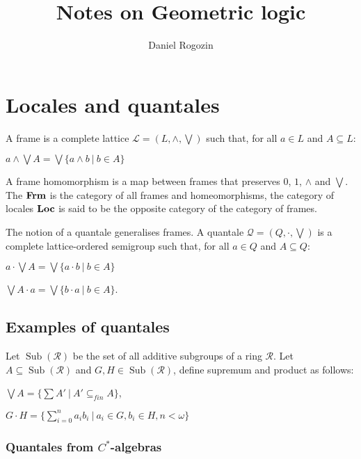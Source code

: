 \documentclass[a4paper]{article}
\author{Daniel Rogozin}
\date{}
\title{Notes on Geometric logic}
\theoremstyle{defin}
\theoremstyle{theorem}
\theoremstyle{claim}
\theoremstyle{prop}
\theoremstyle{lemma}
\theoremstyle{fact}
\theoremstyle{ex}
\theoremstyle{col}
\begin{document}
\maketitle

\tableofcontents

\newpage

\nocite{*}

\section{Locales and quantales}

A frame is a complete lattice $\mathcal{L} = (L, \wedge, \bigvee)$ such that, for all $a \in L$ and $A \subseteq L$:
\begin{center}
$a \wedge \bigvee A = \bigvee \{ a \wedge b \: | \: b \in A \}$
\end{center}
A frame homomorphism is a map between frames that preserves $0$, $1$, $\wedge$ and $\bigvee$. The ${\bf Frm}$ is the category of all frames and homeomorphisms, the category of locales ${\bf Loc}$ is said to be the opposite category of the category of frames.

The notion of a quantale generalises frames. A quantale $\mathcal{Q} = (Q, \cdot, \bigvee)$ is a complete lattice-ordered semigroup such that, for all $a \in Q$ and $A \subseteq Q$:
\begin{center}
$a \cdot \bigvee A = \bigvee \{ a \cdot b \: | \: b \in A \}$

$\bigvee A \cdot a = \bigvee \{ b \cdot a \: | \: b \in A \}$.
\end{center}

\subsection{Examples of quantales}

Let $\operatorname{Sub}(\mathcal{R})$ be the set of all additive subgroups of a ring $\mathcal{R}$. Let $A \subseteq \operatorname{Sub}(\mathcal{R})$ and $G, H \in \operatorname{Sub}(\mathcal{R})$, define supremum and product as follows:
\begin{center}
$\bigvee A = \{ \sum A' \: | \: A' \subseteq_{fin} A \}$,

$G \cdot H = \{ \sum \limits_{i = 0}^n a_i b_i \: | \: a_i \in G, b_i \in H, n < \omega \}$
\end{center}

\subsubsection{Quantales from $C^{*}$-algebras}
\end{document}
